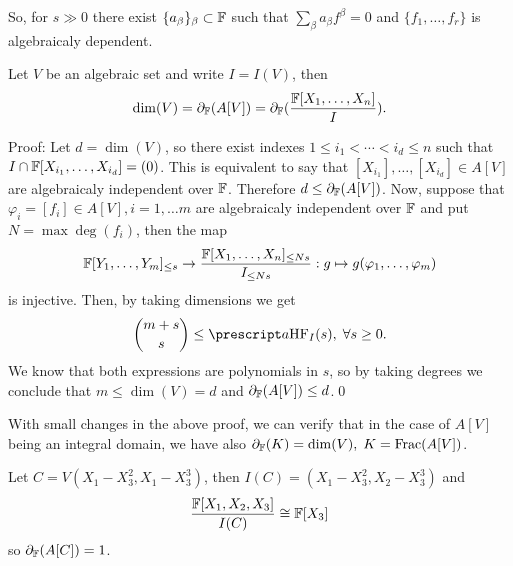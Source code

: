 \begin{itemize}
\begin{example}
    So, for $s\gg0$ there exist $\{a_\beta\}_\beta\subset\mathbb{F}$ such that 
    $\sum_{\beta}a_\beta f^\beta=0$ and $\{f_1,\dots, f_r\}$ is algebraicaly dependent.
    \end{example}
    \begin{theorem}
        Let $V$ be an algebraic set and write $I= I(V)$, then 
        \begin{equation}
            \dim(V) = \partial_{\mathbb{F}}(A[V])=\partial_{\mathbb{F}}(\frac{\mathbb{F}[X_1,\dots, X_n]}{I}).
        \end{equation}
    \end{theorem}
    Proof: Let $d=\dim(V)$, so there exist indexes $1\leq i_1<\cdots<i_d\leq n$ such that 
    $I\cap \mathbb{F}[X_{i_1},\dots,X_{i_d}]=(0)$. This is equivalent to say that 
    $[X_{i_1}],\dots, [X_{i_d}]\in A[V]$ are algebraicaly independent over $\mathbb{F}$. Therefore
    $d\leq \partial_{\mathbb{F}}(A[V])$. Now, suppose that $\varphi_i=[f_i]\in A[V],i=1,\dots m$ are 
    algebraicaly independent over $\mathbb{F}$ and put $N=\max{\deg(f_i)}$, then the map 
    \begin{equation}
        \mathbb{F}[Y_1,\dots, Y_m]_{\leq s}\to \frac{\mathbb{F}[X_1,\dots,X_n]_{\leq Ns}}{I_{\leq Ns}}:g\mapsto g(\varphi_1,\dots,\varphi_m)
    \end{equation}
    is injective. Then, by taking dimensions we get
    \begin{equation}
     \binom{m+s}{s}  \leq \upleft{a}\text{HF}_{I}(s),\;\forall s\geq0. 
    \end{equation}
    We know that both expressions are polynomials in $s$, so by taking degrees we conclude that 
    $m\leq \dim(V) = d$ and $\partial_{\mathbb{F}}(A[V])\leq d$.\qed

    
    With small changes in the above proof, we can verify that in the case of $A[V]$ being an integral domain, we have 
    also $\partial_{\mathbb{F}}(K) = \dim(V),\;K=\text{Frac}(A[V])$.
\begin{example}
    Let $C=V(X_1-X_3^2,X_1-X_3^3)$, then $I(C)=(X_1-X_3^2,X_2-X_3^3)$ and 
    \begin{equation}
        \frac{\mathbb{F}[X_1,X_2,X_3]}{I(C)}\cong \mathbb{F}[X_3]
    \end{equation}
    so $\partial_{\mathbb{F}}(A[C])=1$.
\end{example}


\end{itemize}
